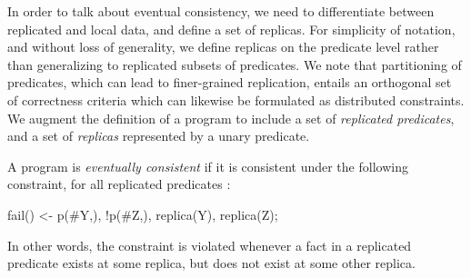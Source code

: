 In order to talk about eventual consistency, we need to differentiate between replicated 
and local
data, and define a set of replicas.  
For simplicity of notation, and without loss of generality, we define replicas on the predicate level rather than generalizing to replicated subsets of predicates.  
We note that partitioning of predicates, which can lead to finer-grained replication, 
entails an orthogonal set of correctness criteria which can likewise be formulated as
distributed constraints.
We augment the definition of a \lang program to include a set of {\em replicated predicates}, and a set of {\em replicas} represented by a unary  predicate.  

\begin{definition}
\label{def:ec}
A \lang program is {\em eventually consistent} if it is consistent under the following constraint, for all replicated predicates :

\begin{Dedalus}
fail() <- p(#Y,), !p(#Z,), replica(Y), replica(Z);
\end{Dedalus}

In other words, the constraint is violated whenever a fact in a replicated predicate exists at some replica, but does not exist at some other replica.
\end{definition}

 



